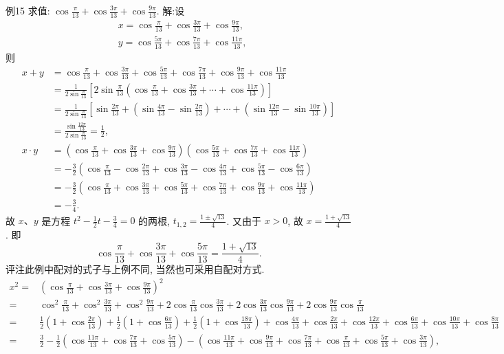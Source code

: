 例15 求值: $\cos \frac{\pi}{13}+\cos \frac{3 \pi}{13}+\cos \frac{9 \pi}{13}$.
解:设
$$
\begin{aligned}
& x=\cos \frac{\pi}{13}+\cos \frac{3 \pi}{13}+\cos \frac{9 \pi}{13}, \\
& y=\cos \frac{5 \pi}{13}+\cos \frac{7 \pi}{13}+\cos \frac{11 \pi}{13},
\end{aligned}
$$
则
$$
\begin{aligned}
x+y & =\cos \frac{\pi}{13}+\cos \frac{3 \pi}{13}+\cos \frac{5 \pi}{13}+\cos \frac{7 \pi}{13}+\cos \frac{9 \pi}{13}+\cos \frac{11 \pi}{13} \\
& =\frac{1}{2 \sin \frac{\pi}{13}}\left[2 \sin \frac{\pi}{13}\left(\cos \frac{\pi}{13}+\cos \frac{3 \pi}{13}+\cdots+\cos \frac{11 \pi}{13}\right)\right] \\
& =\frac{1}{2 \sin \frac{\pi}{13}}\left[\sin \frac{2 \pi}{13}+\left(\sin \frac{4 \pi}{13}-\sin \frac{2 \pi}{13}\right)+\cdots+\left(\sin \frac{12 \pi}{13}-\sin \frac{10 \pi}{13}\right)\right] \\
& =\frac{\sin \frac{12 \pi}{13}}{2 \sin \frac{ \pi}{13}}=\frac{1}{2}, \\
x \cdot y & =\left(\cos \frac{\pi}{13}+\cos \frac{3 \pi}{13}+\cos \frac{9 \pi}{13}\right)\left(\cos \frac{5 \pi}{13}+\cos \frac{7 \pi}{13}+\cos \frac{11 \pi}{13}\right) \\
&=  -\frac{3}{2}\left(\cos \frac{\pi}{13}-\cos \frac{2 \pi}{13}+\cos \frac{3 \pi}{13}-\cos \frac{4 \pi}{13}+\cos \frac{5 \pi}{13}-\cos \frac{6 \pi}{13}\right) \\
& =-\frac{3}{2}\left(\cos \frac{\pi}{13}+\cos \frac{3 \pi}{13}+\cos \frac{5 \pi}{13}+\cos \frac{7 \pi}{13}+\cos \frac{9 \pi}{13}+\cos \frac{11 \pi}{13}\right) \\
& =-\frac{3}{4} .
\end{aligned}
$$
故 $x 、 y$ 是方程 $t^2-\frac{1}{2} t-\frac{3}{4}=0$ 的两根, $t_{1,2}=\frac{1 \pm \sqrt{13}}{4}$.
又由于 $x>0$, 故 $x=\frac{1+\sqrt{13}}{4}$.
即
$$
\cos \frac{\pi}{13}+\cos \frac{3 \pi}{13}+\cos \frac{5 \pi}{13}=\frac{1+\sqrt{13}}{4} .
$$
评注此例中配对的式子与上例不同, 当然也可采用自配对方式.
$$
\begin{aligned}
x^2= & \left(\cos \frac{\pi}{13}+\cos \frac{3 \pi}{13}+\cos \frac{9 \pi}{13}\right)^2 \\
= & \cos ^2 \frac{\pi}{13}+\cos ^2 \frac{3 \pi}{13}+\cos ^2 \frac{9 \pi}{13}+2 \cos \frac{\pi}{13} \cos \frac{3 \pi}{13} +2 \cos \frac{3 \pi}{13} \cos \frac{9 \pi}{13}+2 \cos \frac{9 \pi}{13} \cos \frac{\pi}{13} \\
= & \frac{1}{2}\left(1+\cos \frac{2 \pi}{13}\right)+\frac{1}{2}\left(1+\cos \frac{6 \pi}{13}\right)+\frac{1}{2}\left(1+\cos \frac{18 \pi}{13}\right)  +\cos \frac{4 \pi}{13}+\cos \frac{2 \pi}{13}+\cos \frac{12 \pi}{13}+\cos \frac{6 \pi}{13}+\cos \frac{10 \pi}{13}+\cos \frac{8 \pi}{13} \\
= & \frac{3}{2}-\frac{1}{2}\left(\cos \frac{11 \pi}{13}+\cos \frac{7 \pi}{13}+\cos \frac{5 \pi}{13}\right)  -\left(\cos \frac{11 \pi}{13}+\cos \frac{9 \pi}{13}+\cos \frac{7 \pi}{13}+\cos \frac{\pi}{13}+\cos \frac{5 \pi}{13}+\cos \frac{3 \pi}{13}\right),
\end{aligned}
$$
